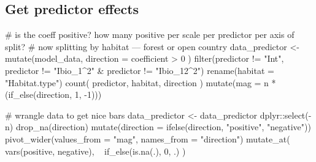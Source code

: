 \documentclass[
]{article}
\newenvironment{Shaded}{}{}
\newcommand{\CommentTok}[1]{\textcolor[rgb]{0.00,0.50,0.00}{#1}}
\newcommand{\DataTypeTok}[1]{#1}
\newcommand{\DecValTok}[1]{#1}
\newcommand{\KeywordTok}[1]{\textcolor[rgb]{0.00,0.00,1.00}{#1}}
\newcommand{\NormalTok}[1]{#1}
\newcommand{\OperatorTok}[1]{#1}
\newcommand{\StringTok}[1]{\textcolor[rgb]{0.00,0.50,0.50}{#1}}
\begin{document}
\hypertarget{get-predictor-effects}{%
\subsection{Get predictor effects}\label{get-predictor-effects}}

\begin{Shaded}
\begin{Highlighting}[]
\CommentTok{# is the coeff positive? how many positive per scale per predictor per axis of split?}
\CommentTok{# now splitting by habitat --- forest or open country}
\NormalTok{data_predictor <-}\StringTok{ }\KeywordTok{mutate}\NormalTok{(model_data,}
  \DataTypeTok{direction =}\NormalTok{ coefficient }\OperatorTok{>}\StringTok{ }\DecValTok{0}
\NormalTok{) }\OperatorTok{%
\StringTok{  }\KeywordTok{filter}\NormalTok{(predictor }\OperatorTok{!=}\StringTok{ "Int"}\NormalTok{, predictor }\OperatorTok{!=}\StringTok{ "Ibio_1^2"} \OperatorTok{&}
\StringTok{    }\NormalTok{predictor }\OperatorTok{!=}\StringTok{ "Ibio_12^2"}\NormalTok{) }\OperatorTok{%
\StringTok{  }\KeywordTok{rename}\NormalTok{(}\DataTypeTok{habitat =} \StringTok{"Habitat.type"}\NormalTok{) }\OperatorTok{%
\StringTok{  }\KeywordTok{count}\NormalTok{(}
\NormalTok{    predictor,}
\NormalTok{    habitat,}
\NormalTok{    direction}
\NormalTok{  ) }\OperatorTok{%
\StringTok{  }\KeywordTok{mutate}\NormalTok{(}\DataTypeTok{mag =}\NormalTok{ n }\OperatorTok{*}\StringTok{ }\NormalTok{(}\KeywordTok{if_else}\NormalTok{(direction, }\DecValTok{1}\NormalTok{, }\DecValTok{-1}\NormalTok{)))}

\CommentTok{# wrangle data to get nice bars}
\NormalTok{data_predictor <-}\StringTok{ }\NormalTok{data_predictor }\OperatorTok{%
\StringTok{  }\NormalTok{dplyr}\OperatorTok{::}\KeywordTok{select}\NormalTok{(}\OperatorTok{-}\NormalTok{n) }\OperatorTok{%
\StringTok{  }\KeywordTok{drop_na}\NormalTok{(direction) }\OperatorTok{%
\StringTok{  }\KeywordTok{mutate}\NormalTok{(}\DataTypeTok{direction =} \KeywordTok{ifelse}\NormalTok{(direction, }\StringTok{"positive"}\NormalTok{, }\StringTok{"negative"}\NormalTok{)) }\OperatorTok{%
\StringTok{  }\KeywordTok{pivot_wider}\NormalTok{(}\DataTypeTok{values_from =} \StringTok{"mag"}\NormalTok{, }\DataTypeTok{names_from =} \StringTok{"direction"}\NormalTok{) }\OperatorTok{%
\StringTok{  }\KeywordTok{mutate_at}\NormalTok{(}
    \KeywordTok{vars}\NormalTok{(positive, negative),}
    \OperatorTok{~}\StringTok{ }\KeywordTok{if_else}\NormalTok{(}\KeywordTok{is.na}\NormalTok{(.), }\DecValTok{0}\NormalTok{, .)}
\NormalTok{  )}

}}}}}}}}}
\end{Highlighting}
\end{Shaded}
\end{document}
